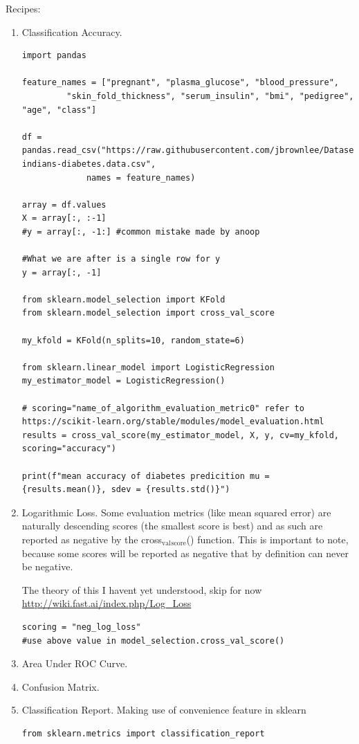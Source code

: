\documentclass[11pt]{article}
\begin{document}
Recipes:
\begin{enumerate}
\item Classification Accuracy.
\label{sec:org69b588c}
\begin{verbatim}
import pandas

feature_names = ["pregnant", "plasma_glucose", "blood_pressure", 
		 "skin_fold_thickness", "serum_insulin", "bmi", "pedigree", "age", "class"]

df = pandas.read_csv("https://raw.githubusercontent.com/jbrownlee/Datasets/master/pima-indians-diabetes.data.csv", 
		     names = feature_names)

array = df.values
X = array[:, :-1]
#y = array[:, -1:] #common mistake made by anoop

#What we are after is a single row for y
y = array[:, -1]

from sklearn.model_selection import KFold
from sklearn.model_selection import cross_val_score

my_kfold = KFold(n_splits=10, random_state=6)

from sklearn.linear_model import LogisticRegression
my_estimator_model = LogisticRegression()

# scoring="name_of_algorithm_evaluation_metric0" refer to https://scikit-learn.org/stable/modules/model_evaluation.html
results = cross_val_score(my_estimator_model, X, y, cv=my_kfold, scoring="accuracy")

print(f"mean accuracy of diabetes predicition mu = {results.mean()}, sdev = {results.std()}")
\end{verbatim}
\item Logarithmic Loss.
\label{sec:org6a44d0d}
Some evaluation metrics (like mean squared error) are naturally
descending scores (the smallest score is best) and as such are
reported as negative by the cross\(_{\text{val}}\)\(_{\text{score}}\)() function. This is
important to note, because some scores will be reported as negative
that by definition can never be negative.

The theory of this I havent yet understood, skip for now
\url{http://wiki.fast.ai/index.php/Log\_Loss}

\begin{verbatim}
scoring = "neg_log_loss"
#use above value in model_selection.cross_val_score()

\end{verbatim}
\item Area Under ROC Curve.
\label{sec:org458daac}
\item Confusion Matrix.
\label{sec:org13b6346}
\item Classification Report.
\label{sec:org56c80f0}
Making use of convenience feature in sklearn
\begin{verbatim}
from sklearn.metrics import classification_report
\end{verbatim}
\end{enumerate}
\end{document}
